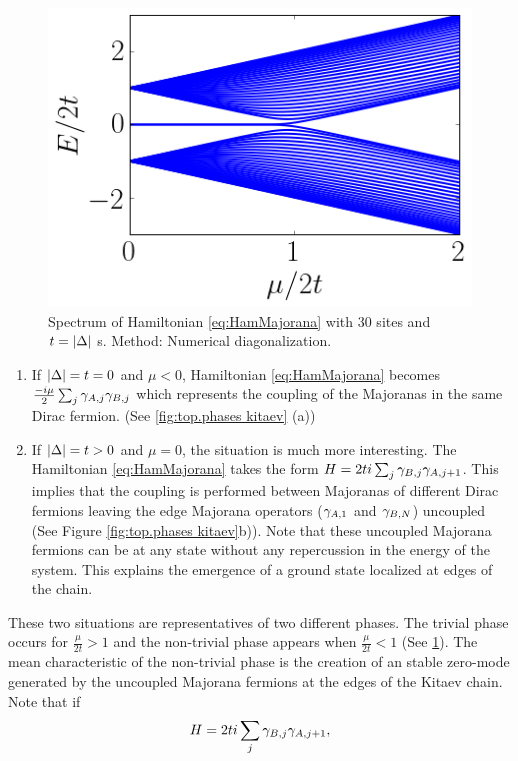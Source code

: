 \begin{figure}[t]
    \centering
    \includegraphics[scale=0.65]{IMAGES/Majorana/Spectrum.png}
    \caption{ \label{fig:KitaevSpec} Spectrum of Hamiltonian \ref{eq:HamMajorana} with $30$ sites and $t=\vert \Delta \vert$ s. Method: Numerical diagonalization. \protect {} }
\end{figure}


\begin{enumerate}

  \item If $\vert \Delta \vert = t = 0$ and $\mu <0$, Hamiltonian \eqref{eq:HamMajorana} becomes $\frac{-i\mu}{2} \sum_{j} \gamma_{A,j}\gamma_{B,j}$ which represents the coupling of the Majoranas in the same Dirac fermion. (See \ref{fig:top.phases kitaev} (a))

  \item If $\vert \Delta \vert = t > 0$ and $\mu =0$, the situation is much more interesting. The Hamiltonian \eqref{eq:HamMajorana} takes the form $H = 2ti\sum_{j}  \gamma_{B,j}\gamma_{A,j+1} $. This implies that the coupling is performed between  Majoranas of different Dirac fermions leaving the edge Majorana operators ($\gamma_{A,1}$ and $\gamma_{B,N}$) uncoupled (See Figure \ref{fig:top.phases kitaev}b)). Note that these uncoupled Majorana fermions can be at any state without any  repercussion in the energy of the system. This explains the emergence of a  ground state localized at edges of the chain. 
\end{enumerate}

These two situations are representatives of two different phases. The trivial phase occurs for $\frac{\mu}{2t}>1$ and the non-trivial phase appears when $\frac{\mu}{2t}<1$ (See \ref{fig:KitaevSpec}). The mean characteristic of the non-trivial phase  is the creation of an stable zero-mode generated by the  uncoupled Majorana fermions at the edges of the Kitaev chain. Note that if
\begin{equation}
H = 2ti\sum_{j}  \gamma_{B,j}\gamma_{A,j+1}, \label{eq:newM} 
\end{equation}
  

